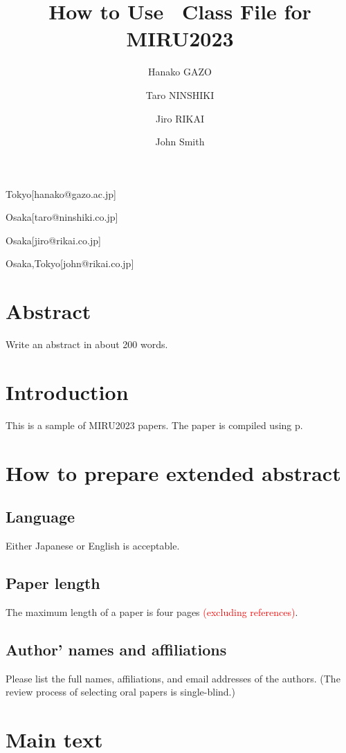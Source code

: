 \documentclass[MIRU,submit,english]{miru2023e}
\begin{document}
\title{How to Use \LaTeXe\ Class File for MIRU2023}


 \author{Hanako GAZO}{Tokyo}[hanako@gazo.ac.jp]
 \author{Taro NINSHIKI}{Osaka}[taro@ninshiki.co.jp]
 \author{Jiro RIKAI}{Osaka}[jiro@rikai.co.jp]
 \author{John Smith}{Osaka,Tokyo}[john@rikai.co.jp]

\maketitle

\section*{Abstract}
Write an abstract in about 200 words.

\section{Introduction}
This is a sample of MIRU2023 papers.
The paper is compiled using p\LaTeXe. 

\section{How to prepare extended abstract}

\subsection{Language}

Either Japanese or English is acceptable. 

\subsection{Paper length}

The maximum length of a paper is four pages \textcolor{red}{(excluding references)}. 

\subsection{Author' names and affiliations}

Please list the full names, affiliations, and email addresses of the authors.
(The review process of selecting oral papers is single-blind.)

\section{Main text}
\end{document}
